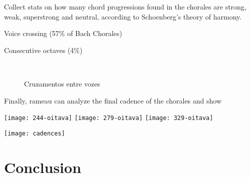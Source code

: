     Collect stats on how many chord
progressions found in the chorales are strong, weak, superstrong and
neutral, according to Schoenberg's theory of harmony.

  Voice crossing (57\% of Bach Chorales)

Consecutive octaves (4\%)

\begin{figure}[!h]
  \centering
   \\
  \caption{Cruzamentos entre vozes}
  \label{fig:coral-003}
\end{figure}

Finally, rameau can analyze the final cadence of the chorales and show

    \texttt{[image: 244-oitava]}
    \texttt{[image: 279-oitava]}
    \texttt{[image: 329-oitava]}

  \texttt{[image: cadences]}

\section{Conclusion}
\label{sec:conclusion}



